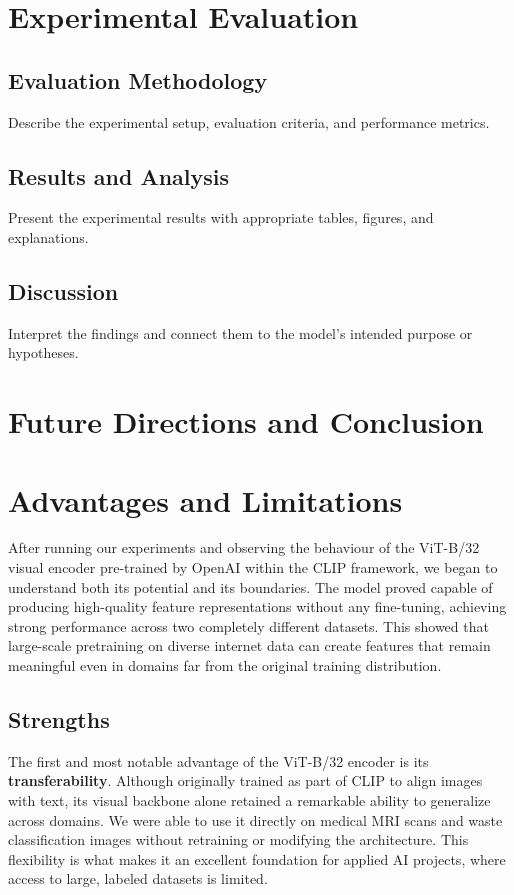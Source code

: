 \documentclass[12pt]{article}
\begin{document}
\section{Experimental Evaluation}

\subsection{Evaluation Methodology}
Describe the experimental setup, evaluation criteria, and performance metrics.

\subsection{Results and Analysis}
Present the experimental results with appropriate tables, figures, and explanations.

\subsection{Discussion}
Interpret the findings and connect them to the model’s intended purpose or hypotheses.


\section{Future Directions and Conclusion}
\section{Advantages and Limitations}

After running our experiments and observing the behaviour of the ViT-B/32 visual encoder pre-trained by OpenAI within the CLIP framework, we began to understand both its potential and its boundaries. The model proved capable of producing high-quality feature representations without any fine-tuning, achieving strong performance across two completely different datasets. This showed that large-scale pretraining on diverse internet data can create features that remain meaningful even in domains far from the original training distribution.

\subsection{Strengths}
The first and most notable advantage of the ViT-B/32 encoder is its \textbf{transferability}. Although originally trained as part of CLIP to align images with text, its visual backbone alone retained a remarkable ability to generalize across domains. We were able to use it directly on medical MRI scans and waste classification images without retraining or modifying the architecture. This flexibility is what makes it an excellent foundation for applied AI projects, where access to large, labeled datasets is limited.
\end{document}
